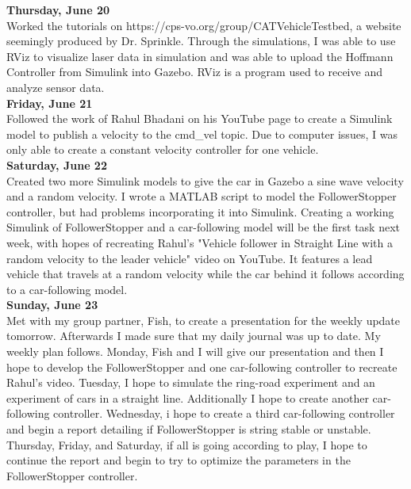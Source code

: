 \documentclass[12pt, letterpaper]{article}
\begin{document}
{\bf Thursday, June 20}\\
Worked the tutorials on https://cps-vo.org/group/CATVehicleTestbed, a website seemingly produced by Dr. Sprinkle. Through the simulations, I was able to use RViz to visualize laser data in simulation and was able to upload the Hoffmann Controller from Simulink into Gazebo. RViz is a program used to receive and analyze sensor data.\\

{\bf Friday, June 21}\\
Followed the work of Rahul Bhadani on his YouTube page to create a Simulink model to publish a velocity to the cmd\_vel topic. Due to computer issues, I was only able to create a constant velocity controller for one vehicle.\\

{\bf Saturday, June 22}\\
Created two more Simulink models to give the car in Gazebo a sine wave velocity and a random velocity. I wrote a MATLAB script to model the FollowerStopper controller, but had problems incorporating it into Simulink. Creating a working Simulink of FollowerStopper and a car-following model will be the first task next week, with hopes of recreating Rahul's "Vehicle follower in Straight Line with a random velocity to the leader vehicle" video on YouTube. It features a lead vehicle that travels at a random velocity while the car behind it follows according to a car-following model.\\

{\bf Sunday, June 23}\\
Met with my group partner, Fish, to create a presentation for the weekly update tomorrow. Afterwards I made sure that my daily journal was up to date. My weekly plan follows. Monday, Fish and I will give our presentation and then I hope to develop the FollowerStopper and one car-following controller to recreate Rahul's video. Tuesday, I hope to simulate the ring-road experiment and an experiment of cars in a straight line. Additionally I hope to create another car-following controller. Wednesday, i hope to create a third car-following controller and begin a report detailing if FollowerStopper is string stable or unstable. Thursday, Friday, and Saturday, if all is going according to play, I hope to continue the report and begin to try to optimize the parameters in the FollowerStopper controller.
\end{document}
